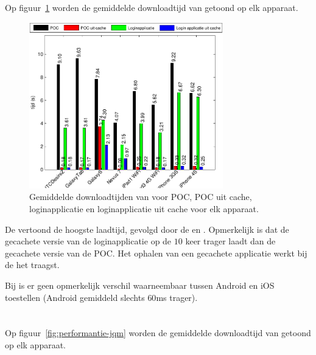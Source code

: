 
\section{\kendo}
\label{app:performantie-kendo}
Op figuur~\ref{fig:performantie-kendo} worden de gemiddelde downloadtijd van \kendo{} getoond op elk apparaat.

\begin{figure}
  \centering
  \includegraphics[width=0.75\textwidth]{figuren/performance-kendo.pdf}
  \caption{Gemiddelde downloadtijden van \kendo{} voor POC,  POC uit cache,  loginapplicatie en loginapplicatie uit cache voor elk apparaat.}
  \label{fig:performantie-kendo}
\end{figure}

De \gtab{} vertoond de hoogste laadtijd,  gevolgd door de \iphoneiii{} en \htc.
Opmerkelijk is dat de gecachete versie van de loginapplicatie op de \nexus{} $10$ keer trager laadt dan de gecachete versie van de POC.
Het ophalen van een gecachete applicatie werkt bij de \gs{} het traagst.

Bij \kendo{} is er geen opmerkelijk verschil waarneembaar tussen Android en iOS toestellen (Android gemiddeld slechts $60$ms trager).


\section{\jqm}
\label{app:performantie-jqm}
Op figuur~\ref{fig:performantie-jqm} worden de gemiddelde downloadtijd van \jqm{} getoond op elk apparaat.

